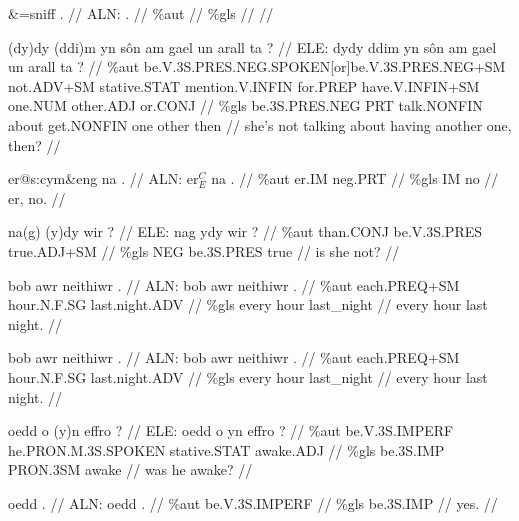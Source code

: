 \documentclass[a4paper,10pt]{article}
\begin{document}
\ex
\begingl[lingstyle=gergl]
\glchat \&=sniff . //
\glsurface ALN:  .  //
\glauto \%aut    //
\glmanual \%gls    //
\gleng  //
\endgl
\xe

\ex
\begingl[lingstyle=gergl]
\glchat (dy)dy (ddi)m yn sôn am gael un arall ta ? //
\glsurface ELE:  dydy ddim yn sôn am gael un arall ta ?  //
\glauto \%aut  be{\scriptsize .V.3S.PRES.NEG.SPOKEN[or]be.V.3S.PRES.NEG+SM} not{\scriptsize .ADV+SM} stative{\scriptsize .STAT} mention{\scriptsize .V.INFIN} for{\scriptsize .PREP} have{\scriptsize .V.INFIN+SM} one{\scriptsize .NUM} other{\scriptsize .ADJ} or{\scriptsize .CONJ}   //
\glmanual \%gls  be{\scriptsize .3S.PRES.NEG} PRT talk{\scriptsize .NONFIN} about get{\scriptsize .NONFIN} one other then    //
\gleng she's not talking about having another one, then? //
\endgl
\xe

\ex
\begingl[lingstyle=gergl]
\glchat er@s:cym\&eng na . //
\glsurface ALN:  er$^{C}_{E}$ na .  //
\glauto \%aut  er{\scriptsize .IM} neg{\scriptsize .PRT}   //
\glmanual \%gls  IM no   //
\gleng er, no. //
\endgl
\xe

\ex
\begingl[lingstyle=gergl]
\glchat na(g) (y)dy wir ? //
\glsurface ELE:  nag ydy wir ?  //
\glauto \%aut  than{\scriptsize .CONJ} be{\scriptsize .V.3S.PRES} true{\scriptsize .ADJ+SM}   //
\glmanual \%gls  NEG be{\scriptsize .3S.PRES} true   //
\gleng is she not? //
\endgl
\xe

\ex
\begingl[lingstyle=gergl]
\glchat bob awr neithiwr . //
\glsurface ALN:  bob awr neithiwr .  //
\glauto \%aut  each{\scriptsize .PREQ+SM} hour{\scriptsize .N.F.SG} last{\scriptsize .night.ADV}   //
\glmanual \%gls  every hour last\_night   //
\gleng every hour last night. //
\endgl
\xe

\ex
\begingl[lingstyle=gergl]
\glchat bob awr neithiwr . //
\glsurface ALN:  bob awr neithiwr .  //
\glauto \%aut  each{\scriptsize .PREQ+SM} hour{\scriptsize .N.F.SG} last{\scriptsize .night.ADV}   //
\glmanual \%gls  every hour last\_night   //
\gleng every hour last night. //
\endgl
\xe

\ex
\begingl[lingstyle=gergl]
\glchat oedd o (y)n effro ? //
\glsurface ELE:  oedd o yn effro ?  //
\glauto \%aut  be{\scriptsize .V.3S.IMPERF} he{\scriptsize .PRON.M.3S.SPOKEN} stative{\scriptsize .STAT} awake{\scriptsize .ADJ}   //
\glmanual \%gls  be{\scriptsize .3S.IMP} PRON{\scriptsize .3SM} awake    //
\gleng was he awake? //
\endgl
\xe

\ex
\begingl[lingstyle=gergl]
\glchat oedd . //
\glsurface ALN:  oedd .  //
\glauto \%aut  be{\scriptsize .V.3S.IMPERF}   //
\glmanual \%gls  be{\scriptsize .3S.IMP}   //
\gleng yes. //
\endgl
\xe
\end{document}
